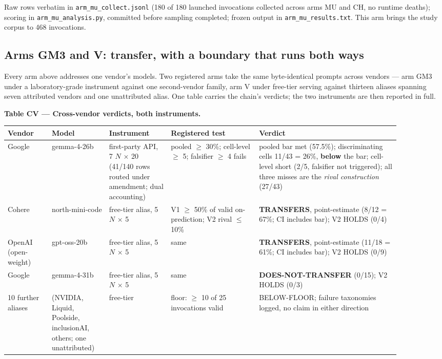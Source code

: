 Raw rows verbatim in \texttt{arm\_mu\_collect.jsonl} (180 of 180 launched invocations collected across arms MU and CH, no
runtime deaths); scoring in \texttt{arm\_mu\_analysis.py}, committed before sampling completed; frozen
output in \texttt{arm\_mu\_results.txt}. This arm brings the study corpus to 468 invocations.

\subsection{Arms GM3 and V: transfer, with a boundary that runs both ways}

Every arm above addresses one vendor's models. Two registered arms take the same
byte-identical prompts across vendors --- arm GM3 under a laboratory-grade instrument against
one second-vendor family, arm V under free-tier serving against thirteen aliases spanning
seven attributed vendors and one unattributed alias. One table carries the chain's verdicts; the two instruments are then reported
in full.

\textbf{Table CV --- Cross-vendor verdicts, both instruments.}

\begin{center}
\begin{small}
\setlength{\tabcolsep}{3.5pt}
\begin{tabular}{@{}p{0.10\linewidth}p{0.13\linewidth}p{0.14\linewidth}p{0.20\linewidth}p{0.32\linewidth}@{}}
\toprule
Vendor & Model & Instrument & Registered test & Verdict \\
\midrule
Google & gemma-4-26b & first-party API, 7 $N$ $\times$ 20 (41/140 rows routed under amendment; dual accounting) & pooled $\ge$ 30\%; cell-level $\ge$ 5; falsifier $\ge$ 4 fails & pooled bar met (57.5\%); discriminating cells 11/43 = 26\%, \textbf{below} the bar; cell-level short (2/5, falsifier not triggered); all three misses are the \emph{rival construction} (27/43) \\
Cohere & north-mini-code & free-tier alias, 5 $N$ $\times$ 5 & V1 $\ge$ 50\% of valid on-prediction; V2 rival $\le$ 10\% & \textbf{TRANSFERS}, point-estimate (8/12 = 67\%; CI includes bar); V2 HOLDS (0/4) \\
OpenAI (open-weight) & gpt-oss-20b & free-tier alias, 5 $N$ $\times$ 5 & same & \textbf{TRANSFERS}, point-estimate (11/18 = 61\%; CI includes bar); V2 HOLDS (0/9) \\
Google & gemma-4-31b & free-tier alias, 5 $N$ $\times$ 5 & same & \textbf{DOES-NOT-TRANSFER} (0/15); V2 HOLDS (0/3) \\
10 further aliases & (NVIDIA, Liquid, Poolside, inclusionAI, others; one unattributed) & free-tier & floor: $\ge$ 10 of 25 invocations valid & BELOW-FLOOR; failure taxonomies logged, no claim in either direction \\
\bottomrule
\end{tabular}
\end{small}
\end{center}

